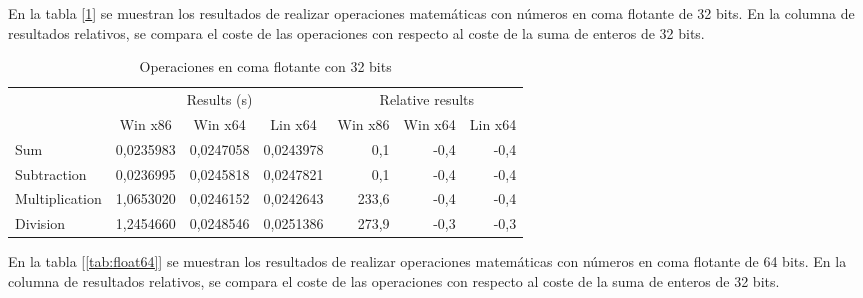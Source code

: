 En la tabla [\ref{tab:float32}] se muestran los resultados de realizar operaciones matemáticas con números en coma flotante de 32 bits. En la columna de resultados relativos, se compara el coste de las operaciones con respecto al coste de la suma de enteros de 32 bits.\\

\begin{table}[h]
\centering
\begin{tabular}{@{}l|rrr|rrr|@{}}
\cmidrule(l){2-7}
                                     & \multicolumn{3}{c|}{Results (s)}                                                               & \multicolumn{3}{c|}{Relative results}                                                      \\ \cmidrule(l){2-7} 
                                     & \multicolumn{1}{c|}{Win x86} & \multicolumn{1}{c|}{Win x64} & \multicolumn{1}{c|}{Lin x64} & \multicolumn{1}{c|}{Win x86} & \multicolumn{1}{c|}{Win x64} & \multicolumn{1}{c|}{Lin x64} \\ \midrule
\multicolumn{1}{|l|}{Sum}            & 0,0235983                    & 0,0247058                    & 0,0243978                    & 0,1                          & -0,4                         & -0,4                         \\ \cmidrule(r){1-1}
\multicolumn{1}{|l|}{Subtraction}    & 0,0236995                    & 0,0245818                    & 0,0247821                    & 0,1                          & -0,4                         & -0,4                         \\ \cmidrule(r){1-1}
\multicolumn{1}{|l|}{Multiplication} & 1,0653020                    & 0,0246152                    & 0,0242643                    & 233,6                        & -0,4                         & -0,4                         \\ \cmidrule(r){1-1}
\multicolumn{1}{|l|}{Division}       & 1,2454660                    & 0,0248546                    & 0,0251386                    & 273,9                        & -0,3                         & -0,3                         \\ \bottomrule
\end{tabular}
\caption{Operaciones en coma flotante con 32 bits}
\label{tab:float32}
\end{table}

En la tabla [\ref{tab:float64}] se muestran los resultados de realizar operaciones matemáticas con números en coma flotante de 64 bits. En la columna de resultados relativos, se compara el coste de las operaciones con respecto al coste de la suma de enteros de 32 bits.\\

